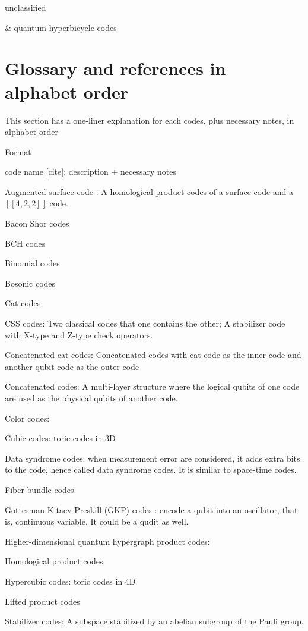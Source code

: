 \documentclass[aps,%
pra, twocolumn,%
notitlepage,longbibliography]{revtex4-2}
\begin{document}
unclassified
\begin{easylist}
  & quantum hyperbicycle codes\cite{kovalev1212quantum}
  
\end{easylist}
  
\section{Glossary and references in alphabet order}
This section has a one-liner explanation for each codes, plus
necessary notes, in alphabet order

Format

code name [cite]: description + necessary notes

Augmented surface code \cite{delfosse2020union}:
A homological product codes of a surface code and a $[[4,2,2]]$ code.

Bacon Shor codes

BCH codes

Binomial codes

Bosonic codes

Cat codes

CSS codes: Two classical codes that one contains the other; A
stabilizer code with X-type and Z-type check operators.

Concatenated cat codes: Concatenated codes with cat code as the inner
code and another qubit code as the outer code

Concatenated codes: A multi-layer structure where the logical qubits
of one code are used as the physical qubits of another code.


Color codes:

Cubic codes: toric codes in 3D

Data syndrome codes: when measurement error are considered, it adds
extra bits to the code, hence called data syndrome codes. It is
similar to space-time codes.

Fiber bundle codes

Gottesman-Kitaev-Preskill (GKP) codes \cite{gottesman2001encoding}: encode a qubit into an
oscillator, that is, continuous variable. It could be a qudit as well.


Higher-dimensional quantum hypergraph product codes:

Homological product codes

Hypercubic codes: toric codes in 4D


Lifted product codes

Stabilizer codes: A subspace stabilized by an abelian subgroup of the
Pauli group.
\end{document}
